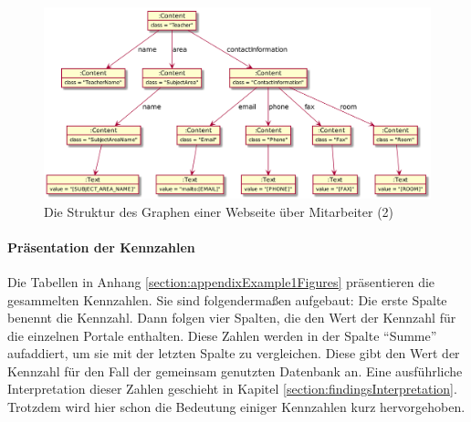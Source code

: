     \begin{figure}[htb]
        \centering
        \includegraphics[scale=\imageScalingFactor]{../resources/findings/case-study-1/dbmodel/dbmodel2.png}
        \caption{Die Struktur des Graphen einer Webseite über Mitarbeiter (2)}
        \label{image:findingTeachersFiguresDbModel2}
    \end{figure}

    \paragraph*{Präsentation der Kennzahlen}
    Die Tabellen in Anhang \ref{section:appendixExample1Figures} präsentieren die gesammelten Kennzahlen.
    Sie sind folgendermaßen aufgebaut:
    Die erste Spalte benennt die Kennzahl.
    Dann folgen vier Spalten, die den Wert der Kennzahl für die einzelnen Portale enthalten.
    Diese Zahlen werden in der Spalte "`Summe"' aufaddiert,
    um sie mit der letzten Spalte zu vergleichen.
    Diese gibt den Wert der Kennzahl für den Fall der gemeinsam genutzten Datenbank an.
    Eine ausführliche Interpretation dieser Zahlen geschieht in Kapitel \ref{section:findingsInterpretation}.
    Trotzdem wird hier schon die Bedeutung einiger Kennzahlen kurz hervorgehoben.

